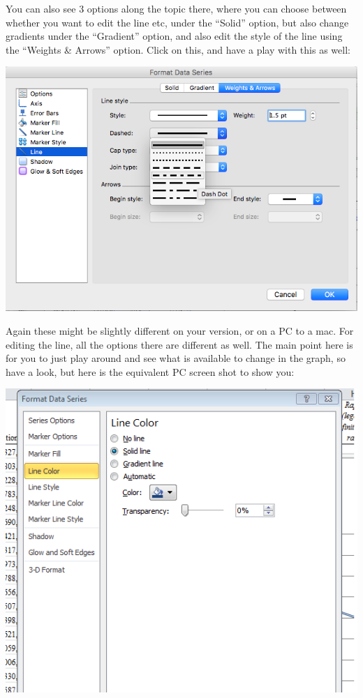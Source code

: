 \documentclass[
]{book}
\begin{document}
You can also see 3 options along the topic there, where you can choose between whether you want to edit the line etc, under the ``Solid'' option, but also change gradients under the ``Gradient'' option, and also edit the style of the line using the ``Weights \& Arrows'' option. Click on this, and have a play with this as well:

\includegraphics{imgs/desc_line_type.png}

Again these might be slightly different on your version, or on a PC to a mac. For editing the line, all the options there are different as well. The main point here is for you to just play around and see what is available to change in the graph, so have a look, but here is the equivalent PC screen shot to show you:

\includegraphics{imgs/pc_line_2.png}
\end{document}
